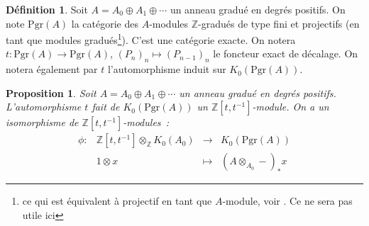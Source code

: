 \documentclass{amsart}
\theoremstyle{plain}
\newtheorem{prop}[theo]{Proposition}
\theoremstyle{definition}
\newtheorem{defi}[theo]{Définition}
\theoremstyle{remark}
\newcommand{\ensemblenombre }[1]{\mathbb{#1}}
\newcommand{\Z}{\ensemblenombre{Z}}
\newcommand{\Pgr}[1]{\mathrm{Pgr}({#1})}
\newcommand{\ra}{\rightarrow}
\begin{document}
\begin{defi}
  Soit $A=A_0\oplus A_1\oplus\dotsb$ un anneau gradué en degrés positifs. On note $\Pgr{A}$ la catégorie des $A$-modules $\Z$-gradués de type fini
  et projectifs
  (en tant que modules gradués\footnote{ce qui est équivalent à projectif en tant que $A$-module, voir \cite[pp.636-637]{Bass}. Ce ne sera pas utile ici}).
  C'est une catégorie exacte.
  On notera $t:\Pgr{A}\ra \Pgr{A}$, $(P_n)_n\mapsto (P_{n-1})_n$ le foncteur exact de décalage. On notera également par $t$ l'automorphisme induit
  sur $K_0(\Pgr{A})$.
\end{defi}

\begin{prop}
  Soit $A=A_0\oplus A_1\oplus\dotsb$ un anneau gradué en degrés positifs.
  L'automorphisme $t$ fait de $K_0(\Pgr{A})$ un $\Z[t,t^{-1}]$-module. On a un isomorphisme de $\Z[t,t^{-1}]$-modules~:
  \[
  \begin{array}{llll}
    \phi:&\Z[t,t^{-1}]\otimes_{\Z}K_0(A_0) &\ra    & K_0(\Pgr{A}) \\
         &1\otimes x                       &\mapsto& (A\otimes_{A_0}-)_*x
  \end{array}
  \]
\end{prop}
\end{document}
